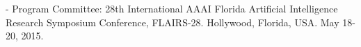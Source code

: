 \begin{innerlist}
\item[-] Program Committee: 28th International AAAI Florida Artificial Intelligence Research Symposium Conference, 
	FLAIRS-28.
	Hollywood, Florida, USA.
	May 18-20, 2015.
\end{innerlist}
